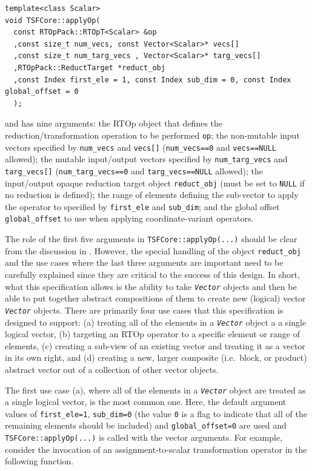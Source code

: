 {\scriptsize\begin{verbatim}
template<class Scalar>
void TSFCore::applyOp(
  const RTOpPack::RTOpT<Scalar> &op
  ,const size_t num_vecs, const Vector<Scalar>* vecs[]
  ,const size_t num_targ_vecs , Vector<Scalar>* targ_vecs[]
  ,RTOpPack::ReductTarget *reduct_obj
  ,const Index first_ele = 1, const Index sub_dim = 0, const Index global_offset = 0
  );
\end{verbatim}}

{}\noindent{}and has nine arguments: the RTOp object that defines the
reduction/transformation operation to be performed {}\texttt{op}; the
non-mutable input vectors specified by {}\texttt{num\_vecs} and
{}\texttt{vecs[]} (\texttt{num\_vecs==0} and {}\texttt{vecs==NULL}
allowed); the mutable input/output vectors specified by
{}\texttt{num\_targ\_vecs} and {}\texttt{targ\-\_vecs[]}
(\texttt{num\_targ\_vecs==0} and {}\texttt{targ\_vecs==NULL} allowed);
the input/output opaque reduction target object {}\texttt{reduct\_obj}
(must be set to {}\texttt{NULL} if no reduction is defined); the range
of elements defining the sub-vector to apply the operator to specified
by {}\texttt{first\_ele} and {}\texttt{sub\_dim}; and the global
offset {}\texttt{global\_offset} to use when applying
coordinate-variant operators.

The role of the first five arguments in
{}\texttt{TSFCore::applyOp(\-...)}  should be clear from the
discussion in {}\cite{ref:rtop_toms}.  However, the special handling
of the object {}\texttt{reduct\_obj} and the use cases where the last
three arguments are important need to be carefully explained since
they are critical to the success of this design.  In short, what this
specification allows is the ability to take {}\texttt{\textit{Vector}}
objects and then be able to put together abstract compositions of them
to create new (logical) vector {}\texttt{\textit{Vector}} objects.
There are primarily four use cases that this specification is designed
to support: (a) treating all of the elements in a
{}\texttt{\textit{Vector}} object a a single logical vector, (b)
targeting an RTOp operator to a specific element or range of elements,
(c) creating a sub-view of an existing vector and treating it as a
vector in its own right, and (d) creating a new, larger composite
(i.e.~block, or product) abstract vector out of a collection of other
vector objects.

The first use case (a), where all of the elements in a
{}\texttt{\textit{Vector}} object are treated as a single logical
vector, is the most common one.  Here, the default argument values of
{}\texttt{first\_ele=1}, {}\texttt{sub\_dim=0} (the value {}\texttt{0}
is a flag to indicate that all of the remaining elements should be
included) and {}\texttt{global\_offset=0} are used and
{}\texttt{TSFCore::applyOp(\-...)} is called with the vector
arguments.  For example, consider the invocation of an
assignment-to-scalar transformation operator in the following
function.

